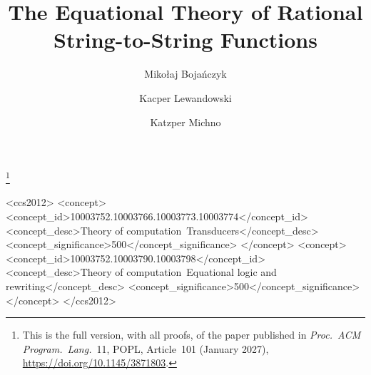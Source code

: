 \documentclass[acmsmall,nonacm]{acmart}
\begin{document}
\title{The Equational Theory of Rational String-to-String Functions}
\thanks{This is the full version, with all proofs, of the paper published in \emph{Proc.\ ACM Program.\ Lang.}\ 11, POPL, Article~101 (January 2027), \url{https://doi.org/10.1145/3871803}.}

\author{Miko{\l}aj Boja\'nczyk}
\author{Kacper Lewandowski}
\author{Katzper Michno}

\begin{abstract}
    
\end{abstract}

\begin{CCSXML}
<ccs2012>
   <concept>
       <concept_id>10003752.10003766.10003773.10003774</concept_id>
       <concept_desc>Theory of computation~Transducers</concept_desc>
       <concept_significance>500</concept_significance>
       </concept>
   <concept>
       <concept_id>10003752.10003790.10003798</concept_id>
       <concept_desc>Theory of computation~Equational logic and rewriting</concept_desc>
       <concept_significance>500</concept_significance>
       </concept>
 </ccs2012>
\end{CCSXML}



\maketitle 




\end{document}
